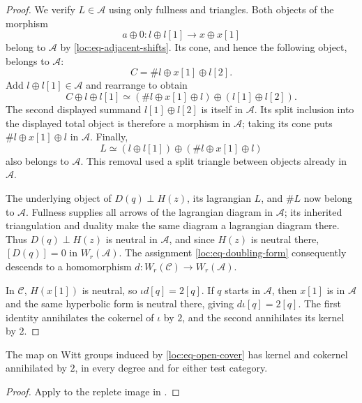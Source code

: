 \begin{proof}
We verify $L\in\mathcal A$ using only fullness and triangles.
Both objects of the morphism
\[
 a\oplus0:l\oplus l[1]\longrightarrow x\oplus x[1]
\]
belong to $\mathcal A$ by \eqref{loc:eq-adjacent-shifts}.  Its cone,
and hence the following object, belongs to $\mathcal A$:
\[
 C=\#l\oplus x[1]\oplus l[2].
\]
Add $l\oplus l[1]\in\mathcal A$ and rearrange to obtain
\[
 C\oplus l\oplus l[1]
 \simeq
 (\#l\oplus x[1]\oplus l)\oplus(l[1]\oplus l[2]).
\]
The second displayed summand $l[1]\oplus l[2]$ is itself in
$\mathcal A$.  Its split inclusion into the displayed total object
is therefore a morphism in $\mathcal A$; taking its cone puts
$\#l\oplus x[1]\oplus l$ in $\mathcal A$.  Finally,
\[
 L\simeq(l\oplus l[1])\oplus(\#l\oplus x[1]\oplus l)
\]
also belongs to $\mathcal A$.  This removal used a split triangle
between objects already in $\mathcal A$.

The underlying object of $D(q)\perp H(z)$, its lagrangian $L$, and
$\#L$ now belong to $\mathcal A$.  Fullness supplies all arrows of
the lagrangian diagram in $\mathcal A$; its inherited triangulation
and duality make the same diagram a lagrangian diagram there.
Thus $D(q)\perp H(z)$ is neutral in $\mathcal A$, and since $H(z)$
is neutral there, $[D(q)]=0$ in $W_r(\mathcal A)$.
The assignment \eqref{loc:eq-doubling-form} consequently descends to
a homomorphism $d:W_r(\mathcal C)\to W_r(\mathcal A)$.

In $\mathcal C$, $H(x[1])$ is neutral, so
$\iota d[q]=2[q]$.  If $q$ starts in $\mathcal A$, then $x[1]$ is
in $\mathcal A$ and the same hyperbolic form is neutral there, giving
$d\iota[q]=2[q]$.  The first identity annihilates the cokernel of
$\iota$ by $2$, and the second annihilates its kernel by $2$.
\end{proof}

\begin{corollary}
\label{loc:cor-open-cover-bound}
The map on Witt groups induced by \eqref{loc:eq-open-cover} has kernel
and cokernel annihilated by $2$, in every degree and for either test
category.
\end{corollary}

\begin{proof}
Apply  to the replete image in
.
\end{proof}
